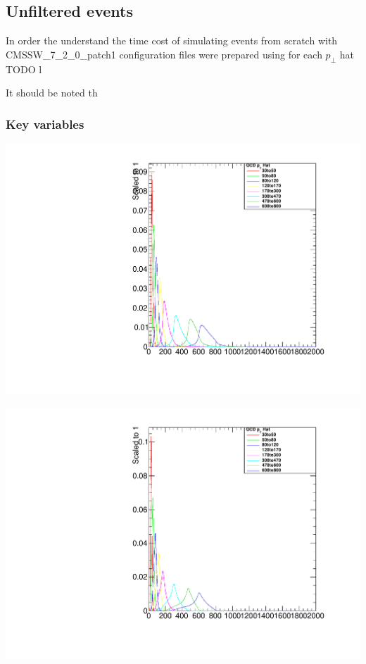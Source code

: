 \documentclass[a4paper]{article}
\begin{document}
\subsection{Unfiltered events}

In order the understand the time cost of simulating events from scratch with CMSSW\_7\_2\_0\_patch1 configuration files were prepared using for each $p_\perp$ hat TODO
l


It should be noted th




\subsubsection{Key variables}

\begin{minipage}{.5\textwidth}
  \centering
  \includegraphics[width=1.0\linewidth]{img/Jet0_Pt.pdf}
\end{minipage}%
\begin{minipage}{0.5\textwidth}
  \centering
  \includegraphics[width=1.0\linewidth]{img/Jet1_Pt.pdf}
\end{minipage}
\end{document}
